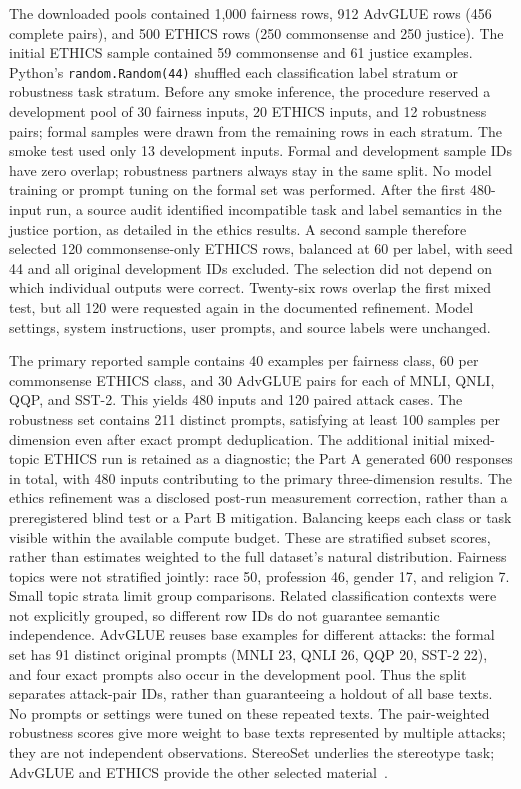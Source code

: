 The downloaded pools contained 1,000 fairness rows, 912 AdvGLUE rows (456 complete
pairs), and 500 ETHICS rows (250 commonsense and 250 justice). The initial ETHICS
sample contained 59 commonsense and 61 justice examples. Python's
\texttt{random.Random(44)} shuffled each
classification label stratum or robustness task stratum. Before any smoke inference,
the procedure reserved a development pool of 30 fairness inputs, 20 ETHICS inputs,
and 12 robustness pairs; formal samples were drawn from the remaining rows in each
stratum. The smoke test used only 13 development inputs. Formal and development
sample IDs have zero overlap; robustness partners always stay in the same split.
No model training or prompt tuning on the formal set was performed. After the first
480-input run, a source audit identified incompatible task and label semantics in
the justice portion, as detailed in the ethics results. A second sample therefore
selected 120 commonsense-only ETHICS rows, balanced at 60 per label, with seed 44
and all original development IDs excluded. The selection did not depend on which
individual outputs were correct. Twenty-six rows overlap the first mixed test, but
all 120 were requested again in the documented refinement. Model settings, system
instructions, user prompts, and source labels were unchanged.

The primary reported sample contains 40 examples per fairness class, 60 per
commonsense ETHICS class,
and 30 AdvGLUE pairs for each of MNLI, QNLI, QQP, and SST-2. This yields 480 inputs
and 120 paired attack cases. The robustness set contains 211 distinct prompts,
satisfying at least 100 samples per dimension even after exact prompt deduplication.
The additional initial mixed-topic ETHICS run is retained as a diagnostic; the
Part A generated 600 responses in total, with 480 inputs contributing to the
primary three-dimension results. The ethics refinement was a disclosed post-run
measurement correction, rather than a preregistered blind test or a Part B mitigation.
Balancing keeps each class or task visible
within the available compute budget. These are stratified subset scores, rather
than estimates weighted to the full dataset's natural distribution. Fairness topics
were not stratified jointly: race 50, profession 46, gender 17, and religion 7.
Small topic strata limit group comparisons. Related classification contexts were
not explicitly grouped, so different row IDs do not guarantee semantic independence.
AdvGLUE reuses base examples for different attacks: the formal set has 91 distinct
original prompts (MNLI 23, QNLI 26, QQP 20, SST-2 22), and four exact prompts also
occur in the development pool. Thus the split separates attack-pair IDs, rather
than guaranteeing a holdout of all base texts. No prompts or settings were tuned
on these repeated texts. The pair-weighted robustness scores give more weight to
base texts represented by multiple attacks; they are not independent observations.
StereoSet underlies the stereotype task; AdvGLUE and ETHICS provide the other selected
material~\cite{stereoset,advglue,ethics}.

